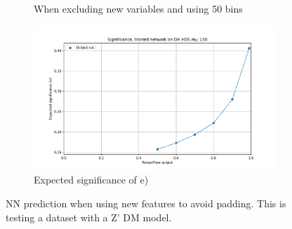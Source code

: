 \documentclass[14pt, a4paper]{book}
\begin{document}
\begin{figure}[!ht]
\begin{subfigure}[b]{0.49\textwidth}
      \caption{When excluding new variables and using 50 bins}
   \end{subfigure}
   \hfill
   \begin{subfigure}[b]{0.49\textwidth}
      \centering
      \includegraphics[width=1\textwidth]{no_pad/EXP_SIG.pdf}
      \caption{Expected significance of e)}
   \end{subfigure}
   \caption[Network performace when testing new variables to avoid padding]{NN prediction when using new features to avoid padding. This is testing a dataset with a Z' DM model.}\label{fig:New_var_pad}
\end{figure}
\clearpage
\end{document}
